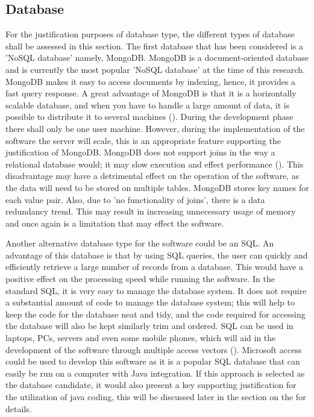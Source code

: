\subsection*{Database}
For the justification purposes of database type, the different types of database shall be assessed in this section. The first database that has been considered is a 'NoSQL database' namely, MongoDB. MongoDB is a document-oriented database and is currently the most popular 'NoSQL database' at the time of this research. MongoDB makes it easy to access documents by indexing, hence, it provides a fast query response. A great advantage of MongoDB is that it is a horizontally scalable database, and when you have to handle a large amount of data, it is possible to distribute it to several machines (\cite{MongoDB5}). During the development phase there shall only be one user machine. However, during the implementation of the software the server will scale, this is an appropriate feature supporting the justification of MongoDB. MongoDB does not support joins in the way a relational database would; it may slow execution and effect performance (\cite{MongoDBComp}). This disadvantage may have a detrimental effect on the operation of the software, as the data will need to be stored on multiple tables. MongoDB stores key names for each value pair. Also, due to 'no functionality of joins', there is a data redundancy trend. This may result in increasing unnecessary usage of memory and once again is a limitation that may effect the software.

Another alternative database type for the software could be an SQL. An advantage of this database is that by using SQL queries, the user can quickly and efficiently retrieve a large number of records from a database. This would have a positive effect on the processing speed while running the software. In the standard SQL, it is very easy to manage the database system. It does not require a substantial amount of code to manage the database system; this will help to keep the code for the database neat and tidy, and the code required for accessing the database will also be kept similarly trim and ordered. SQL can be used in laptops, PCs, servers and even some mobile phones, which will aid in the development of the software through multiple access vectors (\cite{JavaTPoint}). Microsoft access could be used to develop this software as it is a popular SQL database that can easily be run on a computer with Java integration. If this approach is selected as the database candidate, it would also present a key supporting justification for the utilization of java coding, this will be discussed later in the section on the  for details.  


